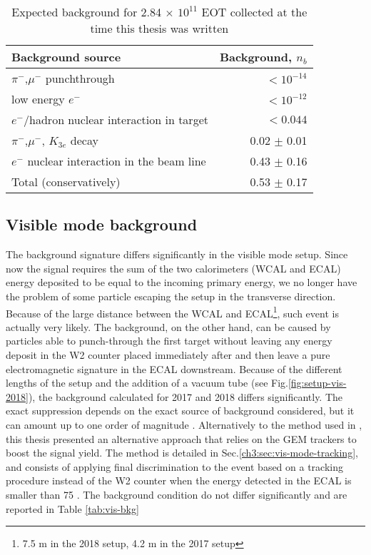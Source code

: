 \begin{table}[bth!]
  \centering
  \caption[Invisible mode background]{Expected background for 2.84 $\times$ $10^{11}$ EOT collected at the time this thesis was written \cite{NA64:2019imj}}
  \begin{tabular}{lr}
    \hline \hline
    Background source & Background, $n_b$ \\
    \hline
    $\pi^-$,$\mu^-$ punchthrough                      & $<10^{-14}$ \\
    low energy $e^-$                                  & $<10^{-12}$ \\
    $e^-$/hadron nuclear interaction in target        & $<0.044$   \\
    $\pi^-$,$\mu^-$, $K_{3e}$ decay                    & 0.02 $\pm$ 0.01 \\
    $e^-$ nuclear interaction in the  beam line       & 0.43 $\pm$ 0.16 \\
    \hline
    Total (conservatively)                            & 0.53 $\pm$ 0.17 \\
    \hline \hline                       
  \end{tabular}
  \label{tab:inv-bkg}
\end{table}


\subsection{Visible mode background}

The background signature differs significantly in the visible mode setup. Since now the signal requires the sum of the two calorimeters (WCAL and ECAL) energy deposited to be equal to the incoming primary energy, we no longer have the problem of some particle escaping the setup in the transverse direction. Because of the large distance between the WCAL and ECAL\footnote{7.5 \si{\meter} in the 2018 setup, 4.2 \si{\meter} in the 2017 setup}, such event is actually very likely. The background, on the other hand, can be caused by particles able to punch-through the first target without leaving any energy deposit in the W2 counter placed immediately after and then leave a pure electromagnetic signature in the ECAL downstream. Because of the different lengths of the setup and the addition of a vacuum tube (see Fig.\ref{fig:setup-vis-2018}), the background calculated for 2017 and 2018 differs significantly. The exact suppression depends on the exact source of background considered, but it can amount up to one order of magnitude \cite{Banerjee:2019hmi}. Alternatively to the method used in \cite{Banerjee:2019hmi}, this thesis presented an alternative approach that relies on the GEM trackers to boost the signal yield. The method is detailed in Sec.\ref{ch3:sec:vis-mode-tracking}, and consists of applying final discrimination to the event based on a tracking procedure instead of the W2 counter when the energy detected in the ECAL is smaller than 75 \gev. The background condition do not differ significantly and are reported in Table \ref{tab:vis-bkg}


